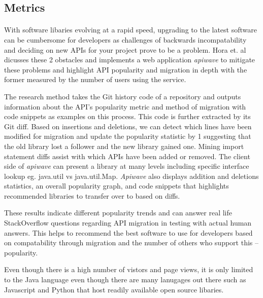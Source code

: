 \documentclass[12pt]{article}
\begin{document}


\subsection{Metrics}
\paragraph{}
With software libaries evolving at a rapid speed, upgrading to the latest software can be cumbersome for developers
as challenges of backwards incompatability and deciding on new APIs for your project prove to be a problem.
Hora et. al \cite{apiwave} dicusses these 2 obstacles and implements a web application \textit{apiwave} \cite{apiwavewebsite} to mitigate these problems and
highlight API popularity and migration in depth with the former measured by the number of users using the service.

The research method takes the Git history code of a repository and outputs information about the API's popularity metric and method of migration with code snippets as examples on this process.
This code is further extracted by its Git diff. Based on insertions and deletions, we can detect which lines have been modified for migration 
and update the popularity statistic by 1 suggesting that the old library lost a follower and the new library gained one.
Mining import statement diffs assist with which APIs have been added or removed.
The client side of \textit{apiwave} \cite{apiwavewebsite} can present a library at many levels including specific interface lookup eg. java.util vs java.util.Map.
\textit{Apiwave} also displays addition and deletions statistics, an overall popularity graph, 
and code snippets that highlights recommended libraries to transfer over to based on diffs.

These results indicate different popularity trends and can answer real life StackOverflow \cite{stackoverflow} 
questions regarding API migration in testing with actual human answers. 
This helps to recommend the best software to use for developers based on compatability through migration
and the number of others who support this -- popularity.

Even though there is a high number of vistors and page views, it is only limited to the Java language even though there are many lanugages out there
such as Javascript and Python that host readily available open source libaries. 
\end{document}
